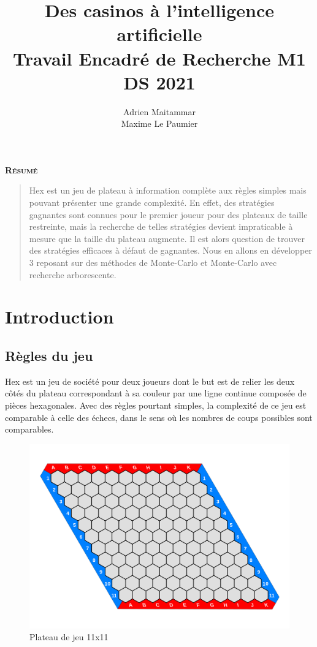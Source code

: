 \documentclass[a4paper]{article}
\title{\huge Des casinos à l'intelligence artificielle\\[15pt] \small Travail Encadré de Recherche M1 DS 2021}
\author{Adrien Maitammar \\ Maxime Le Paumier}
\theoremstyle{definition}
\renewenvironment{abstract}
{
	\centerline
	{\large \bfseries \scshape Résumé}
	\begin{quote}
	}
	{
	\end{quote}
}
\begin{document}
\maketitle

\vspace{40pt}

\begin{abstract}
Hex est un jeu de plateau à information complète aux règles simples mais pouvant présenter une grande complexité. En effet, des stratégies gagnantes sont connues pour le premier joueur pour des plateaux de taille restreinte, mais la recherche de telles stratégies devient impraticable à mesure que la taille du plateau augmente. Il est alors question de trouver des stratégies efficaces à défaut de gagnantes. Nous en allons en développer 3 reposant sur des méthodes de Monte-Carlo et Monte-Carlo avec recherche arborescente. 
\end{abstract}
\newpage

\renewcommand{\contentsname}{Sommaire}
\tableofcontents
 \clearpage
 
 
\section{Introduction}

\subsection{Règles du jeu}

Hex est un jeu de société pour deux joueurs dont le but est de relier les deux côtés du plateau correspondant à sa couleur par une ligne continue composée de pièces hexagonales. Avec des règles pourtant simples, la complexité de ce jeu est comparable à celle des échecs, dans le sens où les nombres de coups possibles sont comparables. 

\begin{figure}[h]
	\centering
	\includegraphics[scale=0.13]{11x11.png}
	\caption{Plateau de jeu 11x11}
\end{figure}
\end{document}
